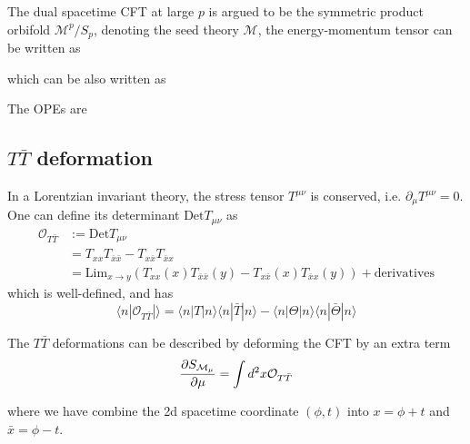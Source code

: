 \documentclass[11pt,a4paper]{article}
\newcommand{\TTbar}{\texorpdfstring{\ensuremath{T\bar{T}}}{TTbar}\xspace}
\begin{document}



The dual spacetime CFT at large $p$ is argued to be the symmetric product orbifold $\mathcal{M}^p/S_p$, denoting the seed theory $\mathcal{M}$, the energy-momentum tensor can be written as 

which can be also written as 

The OPEs are 




\subsection{\TTbar deformation}
In a Lorentzian invariant theory, the stress tensor $T^{\mu\nu}$ is conserved, i.e. $\partial_\mu T^{\mu\nu}=0$. One can define its determinant $\text{Det} T_{\mu\nu}$ as 
\begin{equation}
\begin{split}
    \mathcal O_{T\bar T}&:= \text{Det} T_{\mu\nu} \\
    &=T_{xx}T_{\bar x\bar x}-T_{x\bar x}T_{\bar{x} x} \\
    &=\text{Lim}_{x \rightarrow y} (T_{xx}(x)T_{\bar x\bar x}(y)-T_{x\bar x}(x)T_{\bar{x} x}(y) )+ \text{derivatives}
    \end{split}
\end{equation}
which is well-defined, and has 
\begin{equation}
    \langle n| \mathcal{O}_{T\bar T} |\rangle =\langle n| T |n\rangle \langle n|\bar T |n\rangle -\langle n| 
    \Theta|n\rangle \langle n|\bar{\Theta} |n\rangle
\end{equation}

The $T\bar T$ deformations can be described by deforming the CFT by an extra term 
\begin{equation}
     \frac{\partial S_{\mathcal M_\mu}}{\partial \mu} = \int d^2x \mathcal{O}_{T\bar T}
\end{equation}

where we have combine the 2d spacetime coordinate $(\phi, t)$ into  $x=\phi+t$ and $\bar{x}=\phi-t$.
\end{document}
